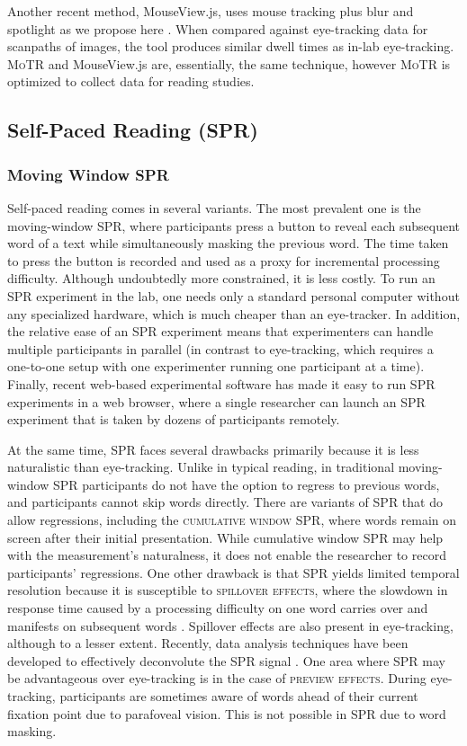 \documentclass[12pt]{article}
\newcommand{\motr}{\textsc{MoTR}\xspace}
\newcommand{\defn}[1]{\textsc{#1}}
\begin{document}
Another recent method, MouseView.js, uses mouse tracking plus blur and spotlight as we propose here \citep{anwyl2021mouseview}. When compared against eye-tracking data for scanpaths of images, the tool produces similar dwell times as in-lab eye-tracking. \motr and MouseView.js are, essentially, the same technique, however \motr is optimized to collect data for reading studies.


\subsection{Self-Paced Reading (SPR)}

\subsubsection{Moving Window SPR}

Self-paced reading comes in several variants. The most prevalent one is the moving-window SPR, where participants press a button to reveal each subsequent word of a text while simultaneously masking the previous word. The time taken to press the button is recorded and used as a proxy for incremental processing difficulty. Although undoubtedly more constrained, it is less costly. To run an SPR experiment in the lab, one needs only a standard personal computer without any specialized hardware, which is much cheaper than an eye-tracker. In addition, the relative ease of an SPR experiment means that experimenters can handle multiple participants in parallel (in contrast to eye-tracking, which requires a one-to-one setup with one experimenter running one participant at a time). Finally, recent web-based experimental software has made it easy to run SPR experiments in a web browser, where a single researcher can launch an SPR experiment that is taken by dozens of participants remotely.

At the same time, SPR faces several drawbacks primarily because it is less naturalistic than eye-tracking. Unlike in typical reading, in traditional moving-window SPR participants do not have the option to regress to previous words, and participants cannot skip words directly. There are variants of SPR that do allow regressions, including the \defn{cumulative window SPR}, where words remain on screen after their initial presentation. While cumulative window SPR may help with the measurement's naturalness, it does not enable the researcher to record participants' regressions. One other drawback is that SPR yields limited temporal resolution because it is susceptible to \defn{spillover effects}, where the slowdown in response time caused by a processing difficulty on one word carries over and manifests on subsequent words \citep{smith2013effect, witzel2012maze, boyce2020amaze}. Spillover effects are also present in eye-tracking, although to a lesser extent. Recently, data analysis techniques have been developed to effectively deconvolute the SPR signal \citep{shain2021continuous}. One area where SPR may be advantageous over eye-tracking is in the case of \defn{preview effects}. During eye-tracking, participants are sometimes aware of words ahead of their current fixation point due to parafoveal vision. This is not possible in SPR due to word masking.
\end{document}
